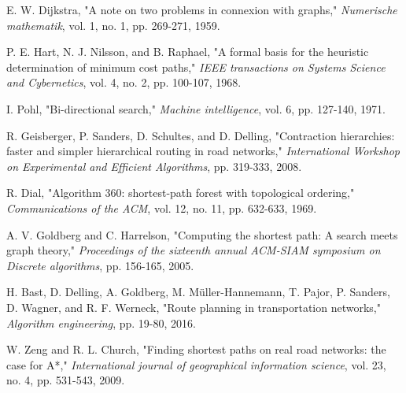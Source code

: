 \documentclass[conference]{IEEEtran}
\begin{document}
\begin{thebibliography}{00}
 E. W. Dijkstra, "A note on two problems in connexion with graphs," \textit{Numerische mathematik}, vol. 1, no. 1, pp. 269-271, 1959.

 P. E. Hart, N. J. Nilsson, and B. Raphael, "A formal basis for the heuristic determination of minimum cost paths," \textit{IEEE transactions on Systems Science and Cybernetics}, vol. 4, no. 2, pp. 100-107, 1968.

 I. Pohl, "Bi-directional search," \textit{Machine intelligence}, vol. 6, pp. 127-140, 1971.

 R. Geisberger, P. Sanders, D. Schultes, and D. Delling, "Contraction hierarchies: faster and simpler hierarchical routing in road networks," \textit{International Workshop on Experimental and Efficient Algorithms}, pp. 319-333, 2008.

 R. Dial, "Algorithm 360: shortest-path forest with topological ordering," \textit{Communications of the ACM}, vol. 12, no. 11, pp. 632-633, 1969.

 A. V. Goldberg and C. Harrelson, "Computing the shortest path: A search meets graph theory," \textit{Proceedings of the sixteenth annual ACM-SIAM symposium on Discrete algorithms}, pp. 156-165, 2005.

 H. Bast, D. Delling, A. Goldberg, M. Müller-Hannemann, T. Pajor, P. Sanders, D. Wagner, and R. F. Werneck, "Route planning in transportation networks," \textit{Algorithm engineering}, pp. 19-80, 2016.

 W. Zeng and R. L. Church, "Finding shortest paths on real road networks: the case for A*," \textit{International journal of geographical information science}, vol. 23, no. 4, pp. 531-543, 2009.
\end{thebibliography}
\end{document}

